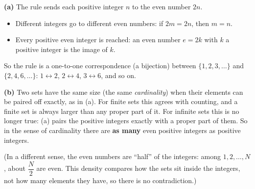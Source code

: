 \textbf{(a)} The rule sends each positive integer $n$ to the even number $2n$.
\begin{itemize}
\item Different integers go to different even numbers: if $2m=2n$, then $m=n$.
\item Every positive even integer is reached: an even number $e=2k$ with $k$ a positive integer is the image of $k$.
\end{itemize}
So the rule is a one-to-one correspondence (a bijection) between $\{1,2,3,\dots\}$ and $\{2,4,6,\dots\}$: $1\leftrightarrow2$, $2\leftrightarrow4$, $3\leftrightarrow6$, and so on.

\textbf{(b)} Two sets have the same size (the same \emph{cardinality}) when their elements can be paired off exactly, as in (a). For finite sets this agrees with counting, and a finite set is always larger than any proper part of it. For infinite sets this is no longer true: (a) pairs the positive integers exactly with a proper part of them. So in the sense of cardinality there are \textbf{as many} even positive integers as positive integers.

(In a different sense, the even numbers are ``half'' of the integers: among $1,2,\dots,N$, about $\dfrac N2$ are even. This density compares how the sets sit inside the integers, not how many elements they have, so there is no contradiction.)
